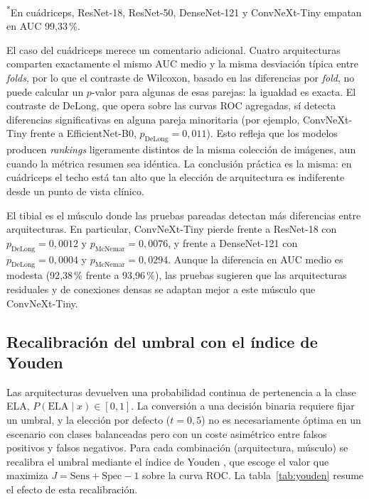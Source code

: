\documentclass[12pt]{extarticle}
\numberwithin{equation}{section}
\begin{document}
\begin{refsection}
\begin{table}[h!]
\smallskip
\footnotesize{\textsuperscript{*}En cuádriceps, ResNet-18, ResNet-50, DenseNet-121 y ConvNeXt-Tiny empatan en AUC 99{,}33\,\%.}
\end{table}

El caso del cuádriceps merece un comentario adicional. Cuatro arquitecturas comparten exactamente el mismo AUC medio y la misma desviación típica entre \textit{folds}, por lo que el contraste de Wilcoxon, basado en las diferencias por \textit{fold}, no puede calcular un $p$-valor para algunas de esas parejas: la igualdad es exacta. El contraste de DeLong, que opera sobre las curvas ROC agregadas, sí detecta diferencias significativas en alguna pareja minoritaria (por ejemplo, ConvNeXt-Tiny frente a EfficientNet-B0, $p_{\text{DeLong}}=0{,}011$). Esto refleja que los modelos producen \textit{rankings} ligeramente distintos de la misma colección de imágenes, aun cuando la métrica resumen sea idéntica. La conclusión práctica es la misma: en cuádriceps el techo está tan alto que la elección de arquitectura es indiferente desde un punto de vista clínico.

El tibial es el músculo donde las pruebas pareadas detectan más diferencias entre arquitecturas. En particular, ConvNeXt-Tiny pierde frente a ResNet-18 con $p_{\text{DeLong}}=0{,}0012$ y $p_{\text{McNemar}}=0{,}0076$, y frente a DenseNet-121 con $p_{\text{DeLong}}=0{,}0004$ y $p_{\text{McNemar}}=0{,}0294$. Aunque la diferencia en AUC medio es modesta (92{,}38\,\% frente a 93{,}96\,\%), las pruebas sugieren que las arquitecturas residuales y de conexiones densas se adaptan mejor a este músculo que ConvNeXt-Tiny.

\subsection{Recalibración del umbral con el índice de Youden}\label{subsec:resultados-youden}

Las arquitecturas devuelven una probabilidad continua de pertenencia a la clase ELA, $P(\text{ELA}\mid x) \in [0,1]$. La conversión a una decisión binaria requiere fijar un umbral, y la elección por defecto ($t = 0{,}5$) no es necesariamente óptima en un escenario con clases balanceadas pero con un coste asimétrico entre falsos positivos y falsos negativos. Para cada combinación (arquitectura, músculo) se recalibra el umbral mediante el índice de Youden \cite{youden1950index}, que escoge el valor que maximiza $J = \text{Sens} + \text{Spec} - 1$ sobre la curva ROC. La tabla~\ref{tab:youden} resume el efecto de esta recalibración.


\end{refsection}
\end{document}
